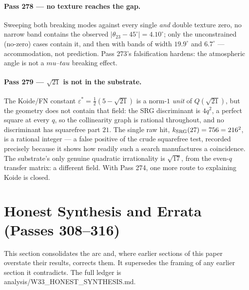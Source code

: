 \documentclass[12pt,a4paper]{article}
\def\mathbf#1{#1}%
\def\texttt#1{#1}%
\def\mu{mu}%
\def\tau{tau}%
\def\cdot{ }%
\theoremstyle{definition}
\begin{document}
\paragraph{Pass 278 --- no texture reaches the gap.} Sweeping both breaking modes
against every single \emph{and} double texture zero, no narrow band contains the
observed $|\theta_{23}-45^\circ|=4.10^\circ$; only the unconstrained (no-zero)
cases contain it, and then with bands of width $19.9^\circ$ and $6.7^\circ$ ---
accommodation, not prediction. Pass 273's falsification hardens: the atmospheric
angle is not a $\mu$--$\tau$ breaking effect.

\paragraph{Pass 279 --- $\sqrt{21}$ is not in the substrate.} The Koide/FN
constant $\varepsilon^\ast=\tfrac12(5-\sqrt{21})$ is a norm-$1$ \emph{unit} of
$\mathbf Q(\sqrt{21})$, but the geometry does not contain that field: the SRG
discriminant is $4q^2$, a perfect square at every $q$, so the collinearity graph
is rational throughout, and no discriminant has squarefree part $21$. The single
raw hit, $k_{\rm SRG}(27)=756=21\cdot6^2$, is a rational integer --- a false
positive of the crude squarefree test, recorded precisely because it shows how
readily such a search manufactures a coincidence. The substrate's only genuine
quadratic irrationality is $\sqrt{17}$, from the even-$q$ transfer matrix: a
different field. With Pass 274, one more route to explaining Koide is closed.


\section{Honest Synthesis and Errata (Passes 308--316)}

This section consolidates the arc and, where earlier sections of this paper
overstate their results, corrects them. It supersedes the framing of any earlier
section it contradicts. The full ledger is
\texttt{analysis/W33\_HONEST\_SYNTHESIS.md}.
\end{document}
